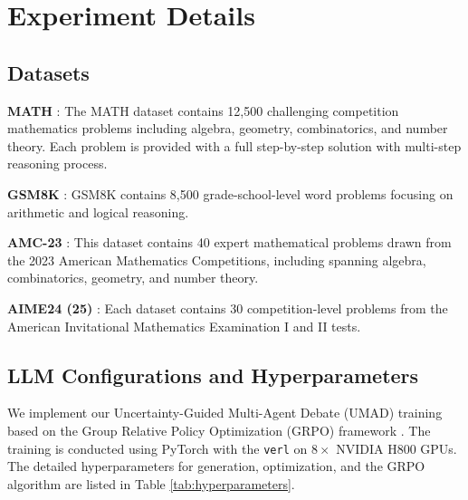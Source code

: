 \documentclass{article}
\theoremstyle{plain}
\theoremstyle{definition}
\theoremstyle{remark}
\begin{document}
\section{Experiment Details}
\label{app:experiment_details}

\subsection{Datasets}

\textbf{MATH} \cite{hendrycks2021measuring}: The MATH dataset contains 12,500 challenging competition mathematics problems including algebra,
geometry, combinatorics, and number theory. Each problem is provided with a full step-by-step solution with multi-step reasoning process.

\textbf{GSM8K} \cite{cobbe2021training}: GSM8K contains 8,500 grade-school-level word problems focusing on arithmetic and logical reasoning.

\textbf{AMC-23} \cite{amc2023}: This dataset contains 40 expert mathematical problems drawn from the 2023 American Mathematics Competitions, including spanning algebra, combinatorics, geometry, and number theory.

\textbf{AIME24 (25)} \cite{aops_aime_2024,aops_aime_2025}: Each dataset contains 30 competition-level problems from the American Invitational Mathematics Examination I and II tests.



\subsection{LLM Configurations and Hyperparameters}\label{app:umad_details}

We implement our Uncertainty-Guided Multi-Agent Debate (UMAD) training based on the Group Relative Policy Optimization (GRPO) framework \cite{shao2024deepseekmath}. The training is conducted using PyTorch with the \texttt{verl} \cite{sheng2025hybridflow} on $8 \times$ NVIDIA H800 GPUs. The detailed hyperparameters for generation, optimization, and the GRPO algorithm are listed in Table \ref{tab:hyperparameters}.
\end{document}
